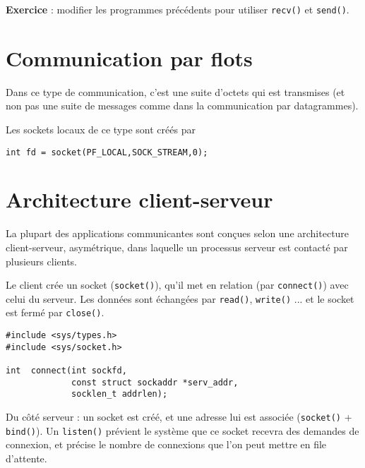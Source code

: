 \textbf{Exercice} : modifier les programmes précédents pour utiliser 
\texttt{recv()} et \texttt{send()}.

\section{Communication par flots}

Dans ce type de communication, c'est une suite d'octets qui est
transmises (et non pas une suite de messages comme dans la
communication par datagrammes). 


Les sockets locaux de ce type sont créés par 

\extrait
\begin{lstlisting}
int fd = socket(PF_LOCAL,SOCK_STREAM,0);
\end{lstlisting}


\section{Architecture client-serveur}

La plupart des applications communicantes sont conçues selon
une architecture client-serveur, asymétrique, 
dans laquelle un processus serveur est contacté par plusieurs
clients.



Le client crée un socket (\texttt{socket()}), qu'il met en relation 
(par \texttt{connect()}) avec celui du serveur. Les données sont
échangées par \texttt{read()}, \texttt{write()} ... et le socket est
fermé par \texttt{close()}. 


\extrait
\begin{lstlisting}
#include <sys/types.h>
#include <sys/socket.h>

int  connect(int sockfd, 
             const struct sockaddr *serv_addr,
             socklen_t addrlen);
\end{lstlisting}


Du côté serveur : un socket est créé, et une adresse lui est associée
(\texttt{socket()} + \texttt{bind()}). Un \texttt{listen()} prévient
le système que ce socket recevra des demandes de connexion, et précise
le nombre de connexions que l'on peut mettre en file d'attente.

